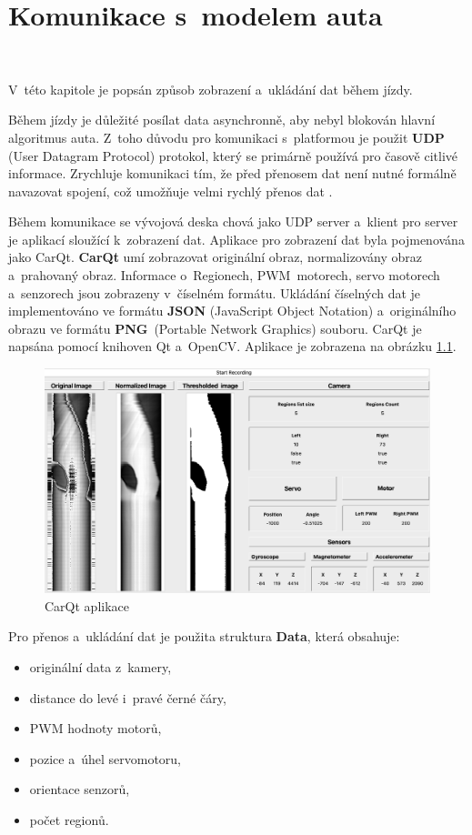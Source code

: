 \chapter{Komunikace s~modelem auta}
\label{sec:PlatformCommunication}\

V~této kapitole je popsán způsob zobrazení a~ukládání dat během jízdy.

Během jízdy je důležité posílat data asynchronně, aby nebyl blokován hlavní
algoritmus auta. Z~toho důvodu pro komunikaci s~platformou je použit \textbf{UDP}
(User Datagram Protocol) protokol, který se primárně používá pro časově citlivé
informace. Zrychluje komunikaci tím, že před přenosem dat není nutné formálně
navazovat spojení, což umožňuje velmi rychlý přenos dat \cite{UDP}.

Během komunikace se vývojová deska chová jako UDP server a~klient pro server je
aplikací sloužící k~zobrazení dat. Aplikace pro zobrazení dat byla pojmenována jako
CarQt. \textbf{CarQt} umí zobrazovat originální obraz, normalizovány obraz
a~prahovaný obraz. Informace o~Regionech, PWM~motorech, servo motorech a~senzorech
jsou zobrazeny v~číselném formátu. Ukládání číselných dat je implementováno ve
formátu \textbf{JSON} (JavaScript Object Notation) a~originálního obrazu ve formátu
\textbf{PNG}~(Portable Network Graphics) souboru. CarQt je napsána pomocí knihoven
Qt a~OpenCV. Aplikace je zobrazena na obrázku \ref{fig:CarQt}.

\begin{figure}[!h]
    \centering
    \vspace{-10pt}
    \includegraphics[width = .8\linewidth]{Figures/CarQt.png}
    \caption{CarQt aplikace}
    \label{fig:CarQt}
    \vspace{-15pt}
\end{figure}

Pro přenos a~ukládání dat je použita struktura \textbf{Data}, která obsahuje:
\begin{itemize}
    \item originální data z~kamery,
    \item distance do levé i~pravé černé čáry,
    \item PWM hodnoty motorů,
    \item pozice a~úhel servomotoru,
    \item orientace senzorů,
    \item počet regionů.
\end{itemize}

